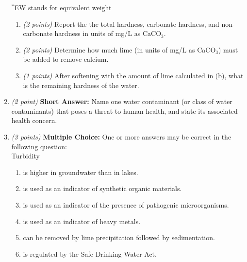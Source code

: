 \documentclass[12pt,letterpaper]{article}
\begin{document}
\begin{enumerate}
$^*$EW stands for equivalent weight

\begin{enumerate}

\item \emph{(2 points)} Report the the total hardness, carbonate hardness, and non-carbonate hardness in units of mg/L as CaCO$_3$.\\
\vspace{1.6in}


\item \emph{(2 points)} Determine how much lime (in units of mg/L as CaCO$_3$) must be added to remove calcium.

\vspace{0.8in}


\item \emph{(1 points)} After softening with the amount of lime calculated in (b), what is the remaining hardness of the water.

\end{enumerate}



\vspace{3in}



\item \emph{(2 point)} \textbf{Short Answer:} Name one water contaminant (or class of water contaminants) that poses a threat to human health, and state its associated health concern.
\vspace{1.4in}


\item \emph{(3 points)} \textbf{Multiple Choice:} One or more answers may be correct in the following question:\\


Turbidity
\begin{enumerate}
\item is higher in groundwater than in lakes.
\item is used as an indicator of synthetic organic materials.
\item is used as an indicator of the presence of pathogenic microorganisms.
\item is used as an indicator of heavy metals.
\item can be removed by lime precipitation followed by sedimentation.
\item is regulated by the Safe Drinking Water Act.
\end{enumerate} 











\end{enumerate}
\end{document}
